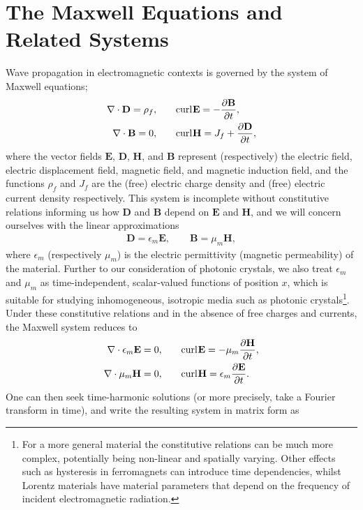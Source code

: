 \section{The Maxwell Equations and Related Systems} \label{sec:MathIntro}
Wave propagation in electromagnetic contexts is governed by the system of Maxwell equations;
\begin{align*}
	\nabla\cdot \mathbf{D} = \rho_f, &\qquad
	\mathrm{curl}_{}\mathbf{E} = -\dfrac{\partial \mathbf{B}}{\partial t}, \\
	\nabla\cdot \mathbf{B} = 0, &\qquad
	 \mathrm{curl}_{}\mathbf{H} = J_f + \dfrac{\partial \mathbf{D}}{\partial t},
\end{align*}
where the vector fields $\mathbf{E}$, $\mathbf{D}$, $\mathbf{H}$, and $\mathbf{B}$ represent (respectively) the electric field, electric displacement field, magnetic field, and magnetic induction field, and the functions $\rho_f$ and $J_f$ are the (free) electric charge density and (free) electric current density respectively.
This system is incomplete without constitutive relations informing us how $\mathbf{D}$ and $\mathbf{B}$ depend on $\mathbf{E}$ and $\mathbf{H}$, and we will concern ourselves with the linear approximations
\begin{align*}
	\mathbf{D} = \epsilon_m \mathbf{E}, \qquad \mathbf{B} = \mu_{m}\mathbf{H},
\end{align*}
where $\epsilon_m$ (respectively $\mu_m$) is the electric permittivity (magnetic permeability) of the material.
Further to our consideration of photonic crystals, we also treat $\epsilon_m$ and $\mu_m$ as time-independent, scalar-valued functions of position $x$, which is suitable for studying inhomogeneous, isotropic media such as photonic crystals\footnote{For a more general material the constitutive relations can be much more complex, potentially being non-linear and spatially varying. 
Other effects such as hysteresis in ferromagnets can introduce time dependencies, whilst Lorentz materials have material parameters that depend on the frequency of incident electromagnetic radiation.}.
Under these constitutive relations and in the absence of free charges and currents, the Maxwell system reduces to
\begin{align*}
	\nabla\cdot \epsilon_m \mathbf{E} = 0, &\qquad
	\mathrm{curl}_{}\mathbf{E} = -\mu_m\dfrac{\partial \mathbf{H}}{\partial t}, \\
	\nabla\cdot \mu_m \mathbf{H} = 0, &\qquad
	 \mathrm{curl}_{}\mathbf{H} = \epsilon_m \dfrac{\partial \mathbf{E}}{\partial t}.
\end{align*}
One can then seek time-harmonic solutions (or more precisely, take a Fourier transform in time), and write the resulting system in matrix form as 
